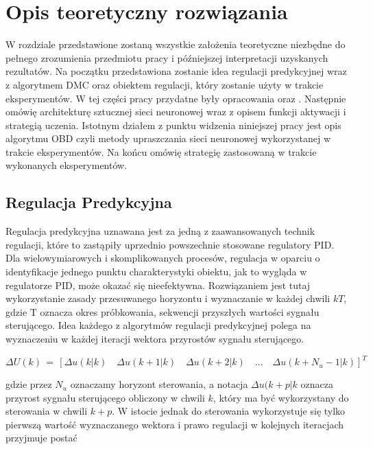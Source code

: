 \newpage %
\section{Opis teoretyczny rozwiązania}
\par W rozdziale przedstawione zostaną wszystkie założenia teoretyczne niezbędne do pełnego zrozumienia przedmiotu pracy i późniejszej interpretacji uzyskanych rezultatów. Na początku przedstawiona zostanie idea regulacji predykcyjnej wraz z algorytmem DMC oraz obiektem regulacji, który zostanie użyty w trakcie eksperymentów. W tej części pracy przydatne były opracowania \cite{stp2009} oraz \cite{tatjewski2016}. Następnie omówię architekturę sztucznej sieci neuronowej wraz z opisem funkcji aktywacji i strategią uczenia. Istotnym działem z punktu widzenia niniejszej pracy jest opis algorytmu OBD czyli metody upraszczania sieci neuronowej wykorzystanej w trakcie eksperymentów. Na końcu omówię strategię zastosowaną w trakcie wykonanych eksperymentów.

\subsection{Regulacja Predykcyjna}
\par Regulacja predykcyjna uznawana jest za jedną z zaawansowanych technik regulacji, które to zastąpiły uprzednio powszechnie stosowane regulatory PID. Dla wielowymiarowych i skomplikowanych procesów, regulacja w oparciu o identyfikacje jednego punktu charakterystyki obiektu, jak to wygląda w regulatorze PID, może okazać się nieefektywna. Rozwiązaniem jest tutaj wykorzystanie zasady przesuwanego horyzontu i wyznaczanie w każdej chwili \(kT\), gdzie T oznacza okres próbkowania, sekwencji przyszłych wartości sygnału sterującego. Idea każdego z algorytmów regulacji predykcyjnej polega na wyznaczeniu w każdej iteracji wektora przyrostów sygnału sterującego.
 
\begin{equation}
\Delta U(k) \, = \, [\Delta u(k|k)\quad \Delta u(k+1|k)\quad \Delta u(k+2|k)\quad ... \quad \Delta u(k + N_u - 1|k)]^T
\end{equation}

gdzie przez \(N_u\) oznaczamy horyzont sterowania, a notacja \(\Delta u(k+p|k\) oznacza przyrost sygnału sterującego obliczony w chwili \(k\), który ma być wykorzystany do sterowania w chwili \(k+p\). W istocie jednak do sterowania wykorzystuje się tylko pierwszą wartość wyznaczanego wektora i prawo regulacji w kolejnych iteracjach przyjmuje postać

